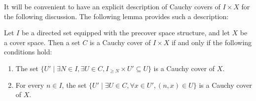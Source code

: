 \documentclass[reqno]{amsart}
\theoremstyle{definition}
\theoremstyle{remark}
\numberwithin{figure}{section}
\begin{document}
It will be convenient to have an explicit description of Cauchy covers of $I \times X$ for the following discussion.
The following lemma provides such a description:

\begin{lem}
Let $I$ be a directed set equipped with the precover space structure, and let $X$ be a cover space.
Then a set $C$ is a Cauchy cover of $I \times X$ if and only if the following conditions hold:
\begin{enumerate}
\item \label{it:dir-char} The set $\{ U' \mid \exists N \in I, \exists U \in C, I_{\geq N} \times U' \subseteq U \}$ is a Cauchy cover of $X$.
\item \label{it:dir-cover} For every $n \in I$, the set $\{ U' \mid \exists U \in C, \forall x \in U', (n,x) \in U \}$ is a Cauchy cover of $X$.
\end{enumerate}
\end{lem}
\end{document}
